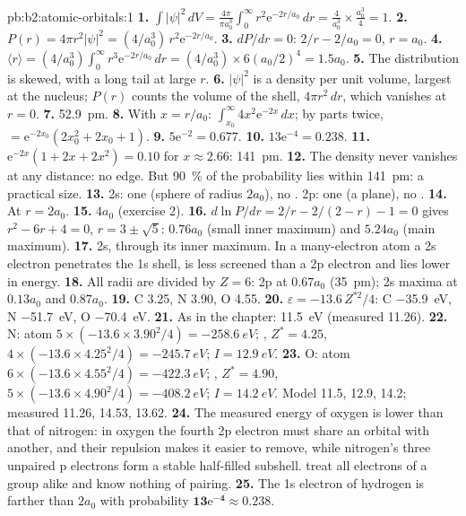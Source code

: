 \begin{solution}{pb:b2:atomic-orbitals:1}
\textbf{1.} $\int|\psi|^2\,dV = \frac{4\pi}{\pi a_0^3}\int_0^\infty r^2\mathrm e^{-2r/a_0}\,dr =
\frac{4}{a_0^3} \times \frac{a_0^3}{4} = 1$.
\textbf{2.} $P(r) = 4\pi r^2|\psi|^2 = (4/a_0^3)\,r^2\mathrm e^{-2r/a_0}$.
\textbf{3.} $dP/dr = 0$: $2/r - 2/a_0 = 0$, $r = a_0$.
\textbf{4.} $\langle r\rangle = (4/a_0^3)\int_0^\infty r^3\mathrm e^{-2r/a_0}\,dr = (4/a_0^3)
\times 6(a_0/2)^4 = 1.5a_0$.
\textbf{5.} The distribution is skewed, with a long tail at large $r$.
\textbf{6.} $|\psi|^2$ is a density per unit volume, largest at the nucleus; $P(r)$
counts the volume of the shell, $4\pi r^2\,dr$, which vanishes at $r = 0$.
\textbf{7.} \qty{52.9}{pm}.
\textbf{8.} With $x = r/a_0$: $\int_{x_0}^\infty 4x^2\mathrm e^{-2x}\,dx$; by parts twice,
$= \mathrm e^{-2x_0}(2x_0^2 + 2x_0 + 1)$.
\textbf{9.} $5\mathrm e^{-2} = 0.677$.
\textbf{10.} $13\mathrm e^{-4} = 0.238$.
\textbf{11.} $\mathrm e^{-2x}(1 + 2x + 2x^2) = 0.10$ for $x \approx 2.66$: \qty{141}{pm}.
\textbf{12.} The density never vanishes at any distance: no edge. But 90~\% of the
probability lies within \qty{141}{pm}: a practical size.
\textbf{13.} 2s: one  (sphere of radius $2a_0$), no . 2p: one
 (a plane), no .
\textbf{14.} At $r = 2a_0$.
\textbf{15.} $4a_0$ (exercise 2).
\textbf{16.} $d\ln P/dr = 2/r - 2/(2 - r) - 1 = 0$ gives $r^2 - 6r + 4 = 0$, $r = 3 \pm \sqrt5$:
$0.76a_0$ (small inner maximum) and $5.24a_0$ (main maximum).
\textbf{17.} 2s, through its inner maximum. In a many-electron atom a 2s electron
penetrates the 1s shell, is less screened than a 2p electron and lies lower in
energy.
\textbf{18.} All radii are divided by $Z = 6$: 2p at $0.67a_0$ (\qty{35}{pm}); 2s maxima
at $0.13a_0$ and $0.87a_0$.
\textbf{19.} C 3.25, N 3.90, O 4.55.
\textbf{20.} $\varepsilon = -13.6\,Z^{*2}/4$: C \qty{-35.9}{eV}, N \qty{-51.7}{eV}, O
\qty{-70.4}{eV}.
\textbf{21.} As in the chapter: \qty{11.5}{eV} (measured 11.26).
\textbf{22.} N: atom $5 \times (-13.6 \times 3.90^2/4) = \qty{-258.6}{eV}$; , $Z^* =
4.25$, $4 \times (-13.6 \times 4.25^2/4) = \qty{-245.7}{eV}$; $I = \qty{12.9}{eV}$.
\textbf{23.} O: atom $6 \times (-13.6 \times 4.55^2/4) = \qty{-422.3}{eV}$; , $Z^* =
4.90$, $5 \times (-13.6 \times 4.90^2/4) = \qty{-408.2}{eV}$; $I = \qty{14.2}{eV}$. Model
11.5, 12.9, 14.2; measured 11.26, 14.53, 13.62.
\textbf{24.} The measured energy of oxygen is lower than that of nitrogen: in
oxygen the fourth 2p electron must share an orbital with another, and their
repulsion makes it easier to remove, while nitrogen's three unpaired p electrons
form a stable half-filled subshell.  treat all electrons of a group
alike and know nothing of pairing.
\textbf{25.} The 1s electron of hydrogen is farther than $2a_0$ with probability
$\boldsymbol{13\mathrm e^{-4} \approx 0.238}$.
\end{solution}
